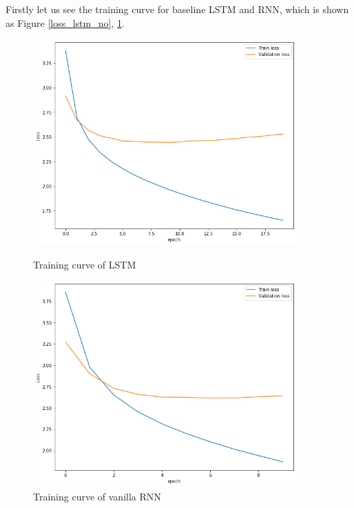 \documentclass{article} %
\begin{document}
Firstly let us see the training curve for baseline LSTM and RNN, which is shown as Figure \ref{loss_lstm_no}, \ref{RNNloss}.

\begin{figure}[htb!]
    \begin{minipage}[t]{0.48\textwidth}
        \centering
        \includegraphics[width=0.9\textwidth]{lstm_no_pretrain_loss.png}
       \caption{Training curve of LSTM}
       \label{loss_lstm_no}
    \end{minipage}
    \begin{minipage}[t]{0.48\textwidth}
        \centering
        \includegraphics[width=0.9\textwidth]{RNNloss}
        \caption{Training curve of vanilla RNN}
        \label{RNNloss}
    \end{minipage}
\end{figure}
\end{document}
